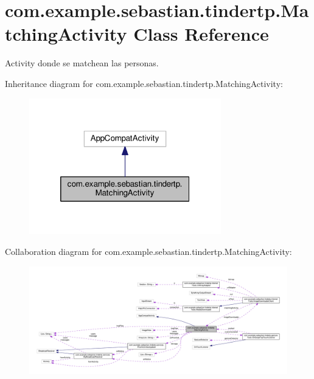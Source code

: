 \hypertarget{classcom_1_1example_1_1sebastian_1_1tindertp_1_1MatchingActivity}{}\section{com.\+example.\+sebastian.\+tindertp.\+Matching\+Activity Class Reference}
\label{classcom_1_1example_1_1sebastian_1_1tindertp_1_1MatchingActivity}


Activity donde se matchean las personas.  




Inheritance diagram for com.\+example.\+sebastian.\+tindertp.\+Matching\+Activity\+:\nopagebreak
\begin{figure}[H]
\begin{center}
\leavevmode
\includegraphics[width=236pt]{classcom_1_1example_1_1sebastian_1_1tindertp_1_1MatchingActivity__inherit__graph}
\end{center}
\end{figure}


Collaboration diagram for com.\+example.\+sebastian.\+tindertp.\+Matching\+Activity\+:
\nopagebreak
\begin{figure}[H]
\begin{center}
\leavevmode
\includegraphics[width=350pt]{classcom_1_1example_1_1sebastian_1_1tindertp_1_1MatchingActivity__coll__graph}
\end{center}
\end{figure}
